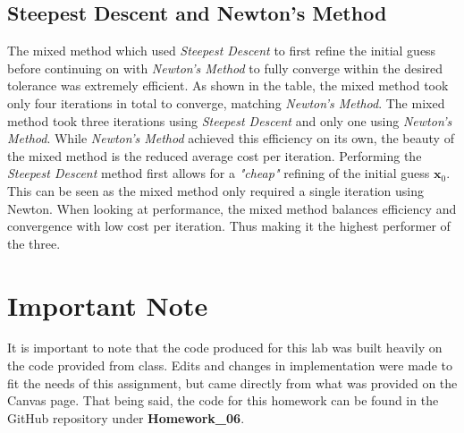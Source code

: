 \documentclass{article}
\begin{document}
\subsection{Steepest Descent and Newton's Method}
The mixed method which used \textit{Steepest Descent} to first refine the initial guess before continuing on with \textit{Newton's Method} to fully converge within the desired tolerance was extremely efficient. As shown in the table, the mixed method took only four iterations in total to converge, matching \textit{Newton's Method}. The mixed method took three iterations using \textit{Steepest Descent} and only one using \textit{Newton's Method}. While \textit{Newton's Method} achieved this efficiency on its own, the beauty of the mixed method is the reduced average cost per iteration. Performing the \textit{Steepest Descent} method first allows for a \textit{"cheap"} refining of the initial guess \(\mathbf{x}_0\). This can be seen as the mixed method only required a single iteration using Newton. When looking at performance, the mixed method balances efficiency and convergence with low cost per iteration. Thus making it the highest performer of the three.

\section{Important Note}
It is important to note that the code produced for this lab was built heavily on the code provided from class. Edits and changes in implementation were made to fit the needs of this assignment, but came directly from what was provided on the Canvas page. That being said, the code for this homework can be found in the GitHub repository under \textbf{Homework\_06}.
\end{document}
